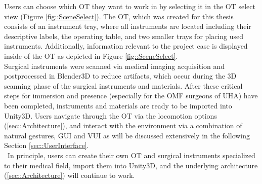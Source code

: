Users can choose which OT they want to work in by selecting it in the OT select view (Figure \ref{fig::SceneSelect}).
The OT, which was created for this thesis consists of an instrument tray, where all instruments are located including their descriptive labels, the operating table, and two smaller trays 
for placing used instruments.
Additionally, information relevant to the project case is displayed inside of the OT as depicted in Figure \ref{fig::SceneSelect}.
\\ Surgical instruments were scanned via medical imaging acquisition and postprocessed in Blender3D to reduce artifacts, which occur during the 3D scanning phase of the surgical instruments and materials.
After these critical steps for immersion and presence (especially for the OMF surgeons of UHA) have been completed, instruments and materials are ready to be imported into Unity3D.
Users navigate through the OT via the locomotion options (\ref{sec::Architecture}), and interact with the environment via a combination of natural gestures, GUI and VUI as will be discussed 
extensively in the following Section \ref{sec::UserInterface}.
\\ In principle, users can create their own OT and surgical instruments specialized to their medical field, import them into Unity3D, and the underlying architecture (\ref{sec::Architecture}) 
will continue to work.